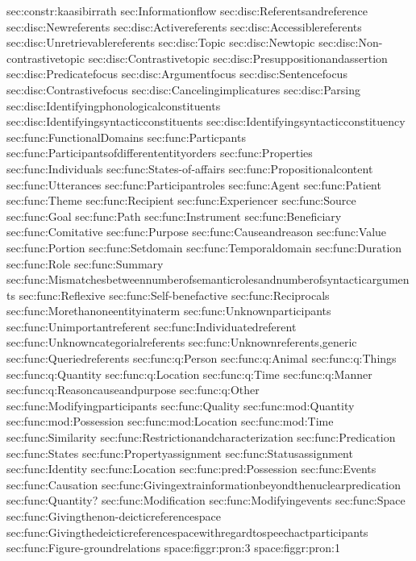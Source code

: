 {sec:constr:kaasibirrath}
{sec:Informationflow}
{sec:disc:Referentsandreference}
{sec:disc:Newreferents}
{sec:disc:Activereferents}
{sec:disc:Accessiblereferents}
{sec:disc:Unretrievablereferents}
{sec:disc:Topic}
{sec:disc:Newtopic}
{sec:disc:Non-contrastivetopic}
{sec:disc:Contrastivetopic}
{sec:disc:Presuppositionandassertion}
{sec:disc:Predicatefocus}
{sec:disc:Argumentfocus}
{sec:disc:Sentencefocus}
{sec:disc:Contrastivefocus}
{sec:disc:Cancelingimplicatures}
{sec:disc:Parsing}
{sec:disc:Identifyingphonologicalconstituents}
{sec:disc:Identifyingsyntacticconstituents}
{sec:disc:Identifyingsyntacticconstituency}
{sec:func:FunctionalDomains}
{sec:func:Particpants}
{sec:func:Participantsofdifferententityorders}
{sec:func:Properties}
{sec:func:Individuals}
{sec:func:States-of-affairs}
{sec:func:Propositionalcontent}
{sec:func:Utterances}
{sec:func:Participantroles}
{sec:func:Agent}
{sec:func:Patient}
{sec:func:Theme}
{sec:func:Recipient}
{sec:func:Experiencer}
{sec:func:Source}
{sec:func:Goal}
{sec:func:Path}
{sec:func:Instrument}
{sec:func:Beneficiary}
{sec:func:Comitative}
{sec:func:Purpose}
{sec:func:Causeandreason}
{sec:func:Value}
{sec:func:Portion}
{sec:func:Setdomain}
{sec:func:Temporaldomain}
{sec:func:Duration}
{sec:func:Role}
{sec:func:Summary}
{sec:func:Mismatchesbetweennumberofsemanticrolesandnumberofsyntacticarguments}
{sec:func:Reflexive}
{sec:func:Self-benefactive}
{sec:func:Reciprocals}
{sec:func:Morethanoneentityinaterm}
{sec:func:Unknownparticipants}
{sec:func:Unimportantreferent}
{sec:func:Individuatedreferent}
{sec:func:Unknowncategorialreferents}
{sec:func:Unknownreferents,generic}
{sec:func:Queriedreferents}
{sec:func:q:Person}
{sec:func:q:Animal}
{sec:func:q:Things}
{sec:func:q:Quantity}
{sec:func:q:Location}
{sec:func:q:Time}
{sec:func:q:Manner}
{sec:func:q:Reasoncauseandpurpose}
{sec:func:q:Other}
{sec:func:Modifyingparticipants}
{sec:func:Quality}
{sec:func:mod:Quantity}
{sec:func:mod:Possession}
{sec:func:mod:Location}
{sec:func:mod:Time}
{sec:func:Similarity}
{sec:func:Restrictionandcharacterization}
{sec:func:Predication}
{sec:func:States}
{sec:func:Propertyassignment}
{sec:func:Statusassignment}
{sec:func:Identity}
{sec:func:Location}
{sec:func:pred:Possession}
{sec:func:Events}
{sec:func:Causation}
{sec:func:Givingextrainformationbeyondthenuclearpredication}
{sec:func:Quantity?}
{sec:func:Modification}
{sec:func:Modifyingevents}
{sec:func:Space}
{sec:func:Givingthenon-deicticreferencespace}
{sec:func:Givingthedeicticreferencespacewithregardtospeechactparticipants}
{sec:func:Figure-groundrelations}
{space:figgr:pron:3}
{space:figgr:pron:1}
